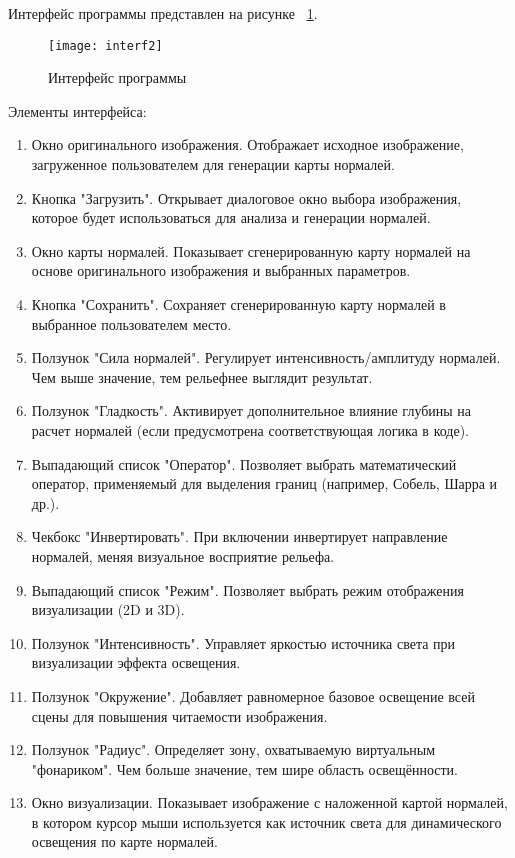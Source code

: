 Интерфейс программы представлен на рисунке ~\ref{interf2:image}.

\begin{figure}[ht]
	\texttt{[image: interf2]}
	\caption{Интерфейс программы}
	\label{interf2:image}
\end{figure}

Элементы интерфейса:
\begin{enumerate}
	\item Окно оригинального изображения. Отображает исходное изображение, загруженное пользователем для генерации карты нормалей.
	\item Кнопка "Загрузить". Открывает диалоговое окно выбора изображения, которое будет использоваться для анализа и генерации нормалей.	
	\item Окно карты нормалей. Показывает сгенерированную карту нормалей на основе оригинального изображения и выбранных параметров.
	\item  Кнопка "Сохранить". Сохраняет сгенерированную карту нормалей в выбранное пользователем место.
	\item Ползунок "Сила нормалей". Регулирует интенсивность/амплитуду нормалей. Чем выше значение, тем рельефнее выглядит результат.
	\item Ползунок "Гладкость". Активирует дополнительное влияние глубины на расчет нормалей (если предусмотрена соответствующая логика в коде).
	\item Выпадающий список "Оператор". Позволяет выбрать математический оператор, применяемый для выделения границ (например, Собель, Шарра и др.).
	\item Чекбокс "Инвертировать". При включении инвертирует направление нормалей, меняя визуальное восприятие рельефа.
	\item Выпадающий список "Режим". Позволяет выбрать режим отображения визуализации (2D и 3D).	
	\item Ползунок "Интенсивность". Управляет яркостью источника света при визуализации эффекта освещения.
	\item Ползунок "Окружение". Добавляет равномерное базовое освещение всей сцены для повышения читаемости изображения.
	\item  Ползунок "Радиус". Определяет зону, охватываемую виртуальным "фонариком". Чем больше значение, тем шире область освещённости.
	\item Окно визуализации. Показывает изображение с наложенной картой нормалей, в котором курсор мыши используется как источник света для динамического освещения по карте нормалей.
\end{enumerate}
